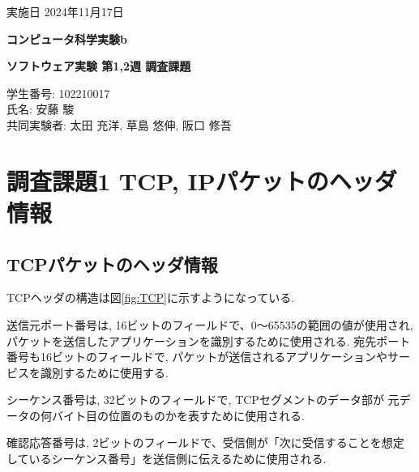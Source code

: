 \documentclass{ltjsarticle} %
\begin{document}
\thispagestyle{empty}
\begin{flushright}
{\large 実施日 2024年11月17日{\hspace{5cm}}} 
\end{flushright}

\vspace*{\fill}
\centering
{\Huge\bf コンピュータ科学実験b}
\vspace*{1cm}

{\huge\bf ソフトウェア実験 第1,2週 調査課題}
\vspace*{\fill}

\vspace*{\fill}

\vspace*{\fill}

\begin{flushright}
{\large 学生番号: 102210017} \\ %
{\large 氏名: 安藤 駿} \\

{\large 共同実験者: 太田 充洋, 草島 悠伸, 阪口 修吾} \\
\end{flushright}

\clearpage

\addtocounter{page}{-1}
\raggedright
\setlength{\parindent}{1em}


\section{調査課題1 TCP, IPパケットのヘッダ情報}

\subsection{TCPパケットのヘッダ情報}

TCPヘッダの構造は図\ref{fig:TCP}に示すようになっている. 

送信元ポート番号は, 16ビットのフィールドで、0～65535の範囲の値が使用され, 
パケットを送信したアプリケーションを識別するために使用される. 
宛先ポート番号も16ビットのフィールドで, パケットが送信されるアプリケーションやサービスを識別するために使用する. 

シーケンス番号は, 32ビットのフィールドで, TCPセグメントのデータ部が
元データの何バイト目の位置のものかを表すために使用される. 

確認応答番号は, 2ビットのフィールドで、受信側が「次に受信することを想定しているシーケンス番号」を送信側に伝えるために使用される. 
\end{document}
